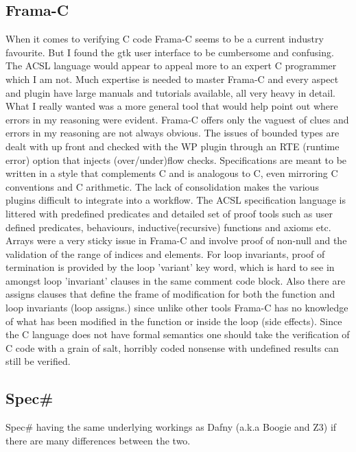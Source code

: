 \documentclass[10pt]{article} %
\begin{document}
\subsection{Frama-C}
	When it comes to verifying C code Frama-C seems to be a current industry favourite. But I found the gtk user interface to be cumbersome and confusing. The ACSL language would appear to appeal more to an expert C programmer which I am not. Much expertise is needed to master Frama-C and every aspect and plugin have large manuals and tutorials available, all very heavy in detail. What I really wanted was a more general tool that would help point out where errors in my reasoning were evident. Frama-C offers only the vaguest of clues and errors in my reasoning are not always obvious. The issues of bounded types are dealt with up front and checked with the WP plugin through an RTE (runtime error) option that injects (over\slash under)flow checks. Specifications are meant to be written in a style that complements C and is analogous to C, even mirroring C conventions and C arithmetic. The lack of consolidation makes the various plugins difficult to integrate into a workflow. The ACSL specification language is littered with predefined predicates and detailed set of proof tools such as user defined predicates, behaviours, inductive(recursive) functions and axioms etc. Arrays were a very sticky issue in Frama-C and involve proof of non-null and the validation of the range of indices and elements. For loop invariants, proof of termination is provided by the loop 'variant' key word, which is hard to see in amongst loop 'invariant' clauses in the same comment code block. Also there are assigns clauses that define the frame of modification for both the function and loop invariants (loop assigns.) since unlike other tools Frama-C has no knowledge of what has been modified in the function or inside the loop (side effects). Since the C language does not have formal semantics one should take the verification of C code with a grain of salt, horribly coded nonsense with undefined results can still be verified.
\subsection{Spec\#}
	Spec\# having the same underlying workings as Dafny (a.k.a Boogie and Z3) if there are many differences between the two.
\newpage
\end{document}

